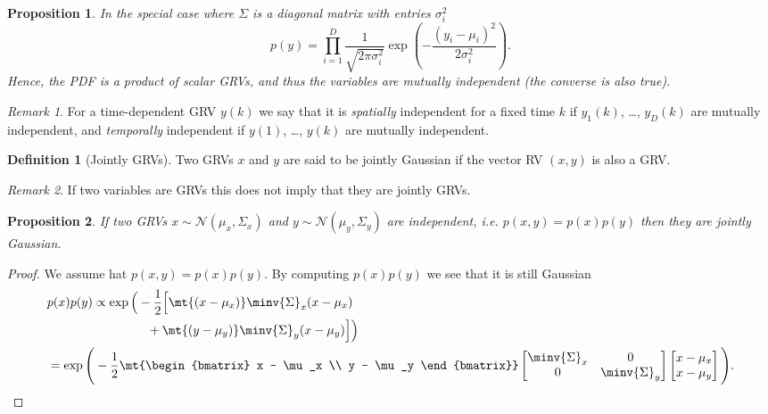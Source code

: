 \documentclass[margin=tiny]{hsrzf}
\theoremstyle{plain}
\newtheorem{prop}{Proposition}[section]
\theoremstyle{definition}
\newtheorem{defn}{Definition}[section]
\theoremstyle{remark}
\newtheorem*{remark}{Remark}
\begin{document}
\begin{prop}
  In the special case where $\Sigma$ is a diagonal matrix with entries
  $\sigma^2_i$
  \[
    p(y) = \prod_{i=1}^D \frac{1}{\sqrt{2\pi \sigma^2_i}}
      \exp\left(-\frac{(y_i - \mu_i)^2}{2\sigma^2_i}\right).
  \]
  Hence, the PDF is a product of scalar GRVs, and thus the variables are
  mutually independent (the converse is also true).
\end{prop}

\begin{remark}
  For a time-dependent GRV $y(k)$ we say that it is \emph{spatially}
  independent for a fixed time $k$ if $y_1(k)$, \dots, $y_D(k)$ are
  mutually independent, and \emph{temporally} independent if $y(1)$, \dots,
  $y(k)$ are mutually independent.
\end{remark}

\begin{defn}[Jointly GRVs]
  Two GRVs $x$ and $y$ are said to be jointly Gaussian if the vector RV $(x,
  y)$ is also a GRV.
\end{defn}

\begin{remark}
  If two variables are GRVs this does not imply that they are jointly GRVs.
\end{remark}

\begin{prop} \label{lem:independent-grvs-joint}
  If two GRVs $x \sim \mathcal{N}(\mu_x, \Sigma_x)$ and $y \sim
  \mathcal{N}(\mu_y, \Sigma_y)$ are independent, i.e. $p(x,y) = p(x)p(y)$
  then they are jointly Gaussian.
\end{prop}
\begin{proof}
  We assume hat $p(x, y) = p(x)p(y)$. By computing $p(x)p(y)$ we see that it
  is still Gaussian
  \begin{align*}
    &p(x)p(y)
    \propto \exp \Big(
      -\frac{1}{2} \Big[
        \mt{(x - \mu_x)} \minv{\Sigma}_x (x - \mu_x) \\
        &\qquad\qquad\qquad\qquad
          + \mt{(y - \mu_y)} \minv{\Sigma}_y (x - \mu_y)
      \Big]
    \Big) \\
    &= \exp \Bigg(
      -\frac{1}{2} \mt{\begin{bmatrix}
        x - \mu_x \\
        y - \mu_y 
      \end{bmatrix}}
      \begin{bmatrix}
        \minv{\Sigma}_x & 0 \\
        0 & \minv{\Sigma}_y
      \end{bmatrix}
      \begin{bmatrix}
        x - \mu_x \\
        x - \mu_y
      \end{bmatrix}
    \Bigg).
    \qedhere
  \end{align*}
\end{proof}
\end{document}
